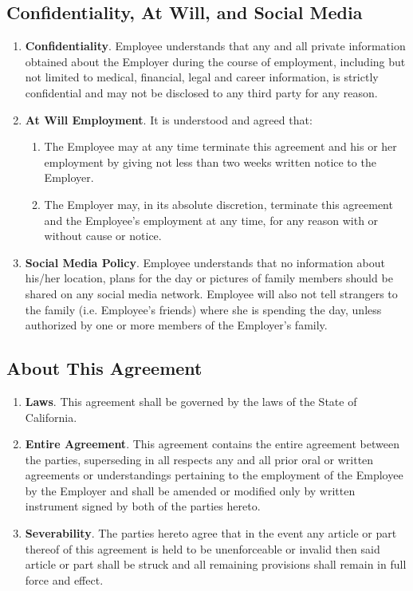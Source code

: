 \documentclass[]{article}
\begin{document}
\subsection*{Confidentiality, At Will, and Social Media}
\begin{enumerate}
	\item{\textbf{Confidentiality}}. Employee understands that any and all private information obtained about the Employer during the course of employment, including but not limited to medical, financial, legal and career information, is strictly confidential and may not be disclosed to any third party for any reason.  
	\item{\textbf{At Will Employment}}. It is understood and agreed that:
		\begin{enumerate}
			\item The Employee may at any time terminate this agreement and his or her employment by giving not less than two weeks written notice to the Employer.
			\item The Employer may, in its absolute discretion, terminate this agreement and the Employee's employment at any time, for any reason with or without cause or notice.
		\end{enumerate}
	\item{\textbf{Social Media Policy}}. Employee understands that no information about his/her location, plans for the day or pictures of family members should be shared on any social media network. Employee will also not tell strangers to the family (i.e.  Employee's friends) where she is spending the day, unless authorized by one or more members of the Employer's family.  
\end{enumerate}

\subsection*{About This Agreement}
\begin{enumerate}
	\item{\textbf{Laws}}. This agreement shall be governed by the laws of the State of California.
	\item{\textbf{Entire Agreement}}. This agreement contains the entire agreement between the parties, superseding in all respects any and all prior oral or written agreements or understandings pertaining to the employment of the Employee by the Employer and shall be amended or modified only by written instrument signed by both of the parties hereto.  
	\item{\textbf{Severability}}. The parties hereto agree that in the event any article or part thereof of this agreement is held to be unenforceable or invalid then said article or part shall be struck and all remaining provisions shall remain in full force and effect. 
\end{enumerate}
\end{document}
